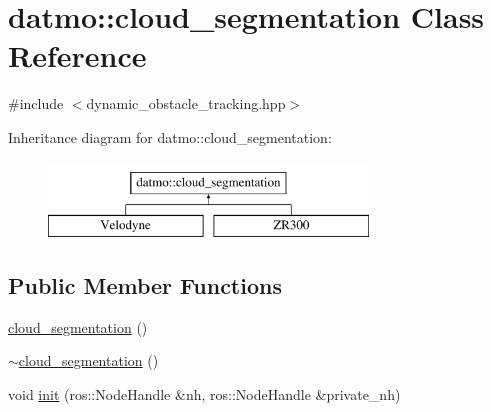 \hypertarget{classdatmo_1_1cloud__segmentation}{}\section{datmo\+:\+:cloud\+\_\+segmentation Class Reference}
\label{classdatmo_1_1cloud__segmentation}


{\ttfamily \#include $<$dynamic\+\_\+obstacle\+\_\+tracking.\+hpp$>$}

Inheritance diagram for datmo\+:\+:cloud\+\_\+segmentation\+:\begin{figure}[H]
\begin{center}
\leavevmode
\includegraphics[height=2.000000cm]{classdatmo_1_1cloud__segmentation}
\end{center}
\end{figure}
\subsection*{Public Member Functions}
\begin{DoxyCompactItemize}
\item 
\hyperlink{classdatmo_1_1cloud__segmentation_a7624176c1ff33d2fa3930bf9eef89c19}{cloud\+\_\+segmentation} ()
\item 
\hyperlink{classdatmo_1_1cloud__segmentation_a493c03c6c372488ed9b507b296af2ed4}{$\sim$cloud\+\_\+segmentation} ()
\item 
void \hyperlink{classdatmo_1_1cloud__segmentation_a9ad8d99df49f5b55a920d477c4dcc0ef}{init} (ros\+::\+Node\+Handle \&nh, ros\+::\+Node\+Handle \&private\+\_\+nh)
\end{DoxyCompactItemize}
